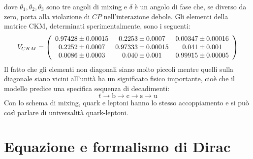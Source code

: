 \documentclass{subnucbo}
\begin{document}
dove $\theta _ { 1 } , \theta _ { 2 } , \theta _ { 3 }$ sono tre angoli di mixing e $\delta$ è un angolo di fase che, se diverso da zero, porta alla violazione di $CP$ nell'interazione debole. Gli elementi della matrice CKM, determinati sperimentalmente, sono i seguenti:
\begin{equation}
        V _ { C K M } = \left( \begin{array} { c c c } { 0.97428 \pm 0.00015 } & { 0.2253 \pm 0.0007 } & { 0.00347 \pm 0.00016 } \\ { 0.2252 \pm 0.0007 } & { 0.97333 \pm 0.00015 } & { 0.041 \pm 0.001 } \\ { 0.0086 \pm 0.0003 } & { 0.040 \pm 0.001 } & { 0.99915 \pm 0.00005 } \end{array} \right)
        \label{eq:ckm_values}
\end{equation}
Il fatto che gli elementi non diagonali siano molto piccoli mentre quelli sulla diagonale siano vicini all'unità ha un significato fisico importante, cioè che il modello predice una specifica sequenza di decadimenti:
\begin{equation}
        t \rightarrow \mathrm { b } \rightarrow \mathrm { c } \rightarrow \mathrm { s } \rightarrow \mathrm { u }
\end{equation}
Con lo schema di mixing, quark e leptoni hanno lo stesso accoppiamento e si può così parlare di universalità quark-leptoni.



\appendix
\section{Equazione e formalismo di Dirac}
\label{app:dirac}
\end{document}
